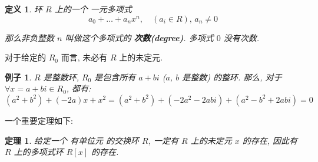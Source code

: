 \documentclass[utf8]{ctexbook}
\newtheorem{theorem}{定理}[section]
\newtheorem{definition}{定义}[section]
\newtheorem{example}{例子}[section]
\begin{document}
\begin{definition}
环 $R$ 上的一个 一元多项式
\begin{equation}
a_0 + \ldots + a_n x^n, \quad (a_i \in R),\, a_n \neq 0 \nonumber
\end{equation}

那么非负整数 $n$ 叫做这个多项式的 \textbf{次数(degree)}. 多项式 $0$ 没有次数.

\end{definition}

对于给定的 $R_0$ 而言, 未必有 $R$ 上的未定元.

\begin{example}
$R$ 是整数环, $R_0$ 是包含所有 $a+bi$ ($a$, $b$ 是整数) 的整环. 那么, 对于 $\forall x = a + bi \in R_0$, 都有:
\begin{equation}
(a^2 + b^2) + (-2a) x  + x^2 = (a^2 + b^2) + (-2 a^2 - 2 ab i) + (a^2 - b^2 + 2ab i)  =  0 \nonumber
\end{equation}
\end{example}

一个重要定理如下:

\begin{theorem}\label{theorem_2_6_existence_polynomial_ring}
给定一个 有单位元 的交换环 $R$, 一定有 $R$ 上的未定元 $x$ 的存在, 因此有 $R$ 上的多项式环 $R[x]$ 的存在.
\end{theorem}
\end{document}
